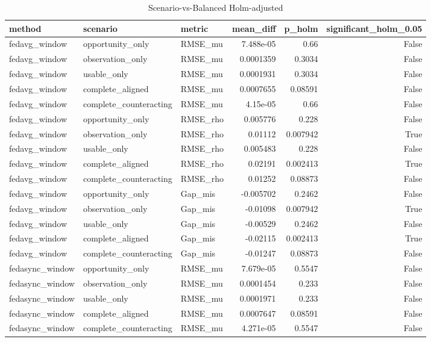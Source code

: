 \begin{table}
\caption{Scenario-vs-Balanced Holm-adjusted}
\label{tab:table_e2b}
\begin{tabular}{lllrrr}
\toprule
method & scenario & metric & mean_diff & p_holm & significant_holm_0.05 \\
\midrule
fedavg_window & opportunity_only & RMSE_mu & 7.488e-05 & 0.66 & False \\
fedavg_window & observation_only & RMSE_mu & 0.0001359 & 0.3034 & False \\
fedavg_window & usable_only & RMSE_mu & 0.0001931 & 0.3034 & False \\
fedavg_window & complete_aligned & RMSE_mu & 0.0007655 & 0.08591 & False \\
fedavg_window & complete_counteracting & RMSE_mu & 4.15e-05 & 0.66 & False \\
fedavg_window & opportunity_only & RMSE_rho & 0.005776 & 0.228 & False \\
fedavg_window & observation_only & RMSE_rho & 0.01112 & 0.007942 & True \\
fedavg_window & usable_only & RMSE_rho & 0.005483 & 0.228 & False \\
fedavg_window & complete_aligned & RMSE_rho & 0.02191 & 0.002413 & True \\
fedavg_window & complete_counteracting & RMSE_rho & 0.01252 & 0.08873 & False \\
fedavg_window & opportunity_only & Gap_mis & -0.005702 & 0.2462 & False \\
fedavg_window & observation_only & Gap_mis & -0.01098 & 0.007942 & True \\
fedavg_window & usable_only & Gap_mis & -0.00529 & 0.2462 & False \\
fedavg_window & complete_aligned & Gap_mis & -0.02115 & 0.002413 & True \\
fedavg_window & complete_counteracting & Gap_mis & -0.01247 & 0.08873 & False \\
fedasync_window & opportunity_only & RMSE_mu & 7.679e-05 & 0.5547 & False \\
fedasync_window & observation_only & RMSE_mu & 0.0001454 & 0.233 & False \\
fedasync_window & usable_only & RMSE_mu & 0.0001971 & 0.233 & False \\
fedasync_window & complete_aligned & RMSE_mu & 0.0007647 & 0.08591 & False \\
fedasync_window & complete_counteracting & RMSE_mu & 4.271e-05 & 0.5547 & False \\

\end{tabular}
\end{table}
